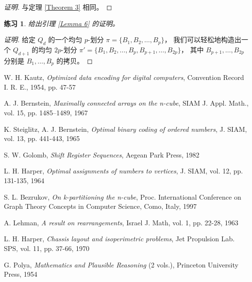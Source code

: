 \documentclass[12pt, a4paper]{article}
\newtheorem{exercisewithanswer}{练习}
\begin{document}
\begin{proof}[证明]
与定理 \ref{Theorem 3} 相同。
\end{proof}

\begin{exercisewithanswer}
给出引理 \ref{Lemma 6} 的证明。
\end{exercisewithanswer}

\begin{proof}[证明]
给定 $Q_d$ 的一个均匀 $p$-划分 $\pi = \{B_1, B_2, \dots, B_p\}$，
我们可以轻松地构造出一个 $Q_{d + 1}$ 的均匀 $2 p$-划分
$\pi' = \{B_1, B_2, \dots, B_p, B_{p + 1}, \dots, B_{2 p}\}$，
其中 $B_{p + 1}, \dots, B_{2 p}$ 分别是 $B_1, \dots, B_p$ 的拷贝。
\end{proof}

\clearpage

\begin{thebibliography}{9}
\label{Bibliography}

	W. H. Kautz,
	\emph{Optimized data encoding for digital computers},
	Convention Record I. R. E., 1954, pp. 47-57

	A. J. Bernstein,
	\emph{Maximally connected arrays on the n-cube},
	SIAM J. Appl. Math., vol. 15, pp. 1485–1489, 1967

	K. Steiglitz, A. J. Bernstein,
	\emph{Optimal binary coding of ordered numbers},
	J. SIAM, vol. 13, pp. 441-443, 1965

	S. W. Golomb,
	\emph{Shift Register Sequences},
	Aegean Park Press, 1982

	L. H. Harper,
	\emph{Optimal assignments of numbers to vertices},
	J. SIAM, vol. 12, pp. 131-135, 1964

	S. L. Bezrukov,
	\emph{On k-partitioning the n-cube},
	Proc. International Conference on Graph Theory Concepts in Computer Science,
	Como, Italy, 1997

	A. Lehman,
	\emph{A result on rearrangements},
	Israel J. Math, vol. 1, pp. 22-28, 1963

	L. H. Harper,
	\emph{Chassis layout and isoperimetric problems},
	Jet Propulsion Lab. SPS, vol. 11, pp. 37-66, 1970

	G. Polya,
	\emph{Mathematics and Plausible Reasoning} (2 vols.),
	Princeton University Press, 1954

\end{thebibliography}
\end{document}
